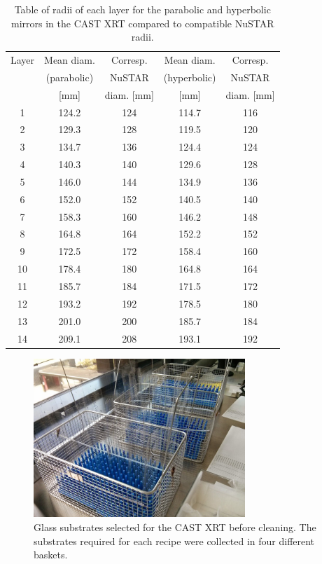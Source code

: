 \begin{table}[p]
\begin{center}
\begin{tabular}{c|c|c|c|c}
Layer & Mean diam. & Corresp. & Mean diam. & Corresp. \\
& (parabolic)  & NuSTAR & (hyperbolic)  & NuSTAR  \\
& [mm] &  diam. [mm] & [mm] &  diam. [mm]\\
\hline
1&124.2&124&114.7&116\\
2&129.3&128&119.5&120\\
3&134.7&136&124.4&124\\
4&140.3&140&129.6&128\\
5&146.0&144&134.9&136\\
6&152.0&152&140.5&140\\
7&158.3&160&146.2&148\\
8&164.8&164&152.2&152\\
9&172.5&172&158.4&160\\
10&178.4&180&164.8&164\\
11&185.7&184&171.5&172\\
12&193.2&192&178.5&180\\
13&201.0&200&185.7&184\\
14&209.1&208&193.1&192
\end{tabular}
\end{center}
\caption{\footnotesize Table of radii of each layer for the parabolic and hyperbolic mirrors in the CAST XRT compared to compatible NuSTAR radii.}\label{tab:cast_pieces}
\end{table}

\begin{figure}[htbp]
  \centering  \includegraphics[height=6cm]{figures/cast/pieces_for_cleaning.jpg}
  \caption{\footnotesize Glass substrates selected for the CAST XRT before cleaning. The substrates required for each recipe were collected in four different baskets.}
  \label{fig:pieces_for_cleaning}
\end{figure}

